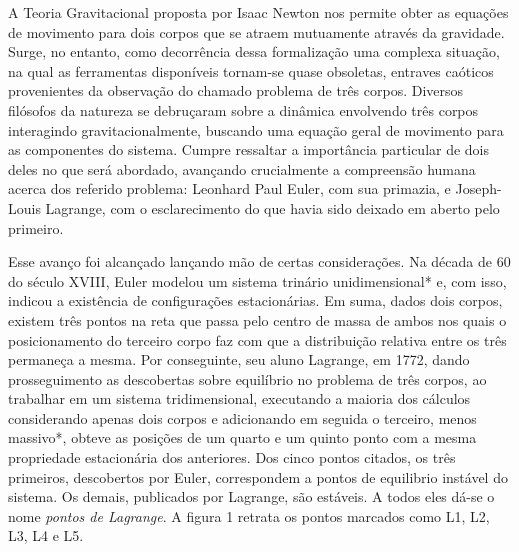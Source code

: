 A Teoria Gravitacional proposta por Isaac Newton nos permite obter as equações de movimento para  dois corpos que se atraem mutuamente através da gravidade. Surge, no entanto, como decorrência dessa formalização uma complexa situação, na qual as ferramentas disponíveis tornam-se quase obsoletas, entraves caóticos provenientes da observação do chamado problema de três corpos. Diversos filósofos da natureza se debruçaram sobre a dinâmica envolvendo três corpos interagindo gravitacionalmente, buscando uma equação geral de movimento para as componentes do sistema. Cumpre ressaltar a importância particular de dois deles no que será abordado, avançando crucialmente a compreensão humana acerca dos referido problema: Leonhard Paul Euler, com sua primazia, e Joseph-Louis Lagrange, com o esclarecimento do que havia sido deixado em aberto pelo primeiro.
   
Esse avanço foi alcançado lançando mão de certas considerações. Na década de 60 do século XVIII, Euler modelou um sistema trinário unidimensional* e, com isso, indicou a existência de configurações estacionárias. Em suma, dados dois corpos, existem três pontos na reta que passa pelo centro de massa de ambos nos quais o posicionamento do terceiro corpo faz com que a distribuição relativa entre os três permaneça a mesma. Por conseguinte, seu aluno Lagrange, em 1772, dando prosseguimento as descobertas sobre equilíbrio no problema de três corpos, ao trabalhar em um sistema tridimensional, executando a maioria dos cálculos considerando apenas dois corpos e adicionando em seguida o terceiro, menos massivo*, obteve as posições de um quarto e um quinto ponto com a mesma propriedade estacionária dos anteriores. Dos cinco pontos citados, os três primeiros, descobertos por Euler, correspondem a pontos de equilibrio instável do sistema. Os demais, publicados por Lagrange, são estáveis. A todos eles dá-se o nome \textit{pontos de Lagrange}. A figura 1 retrata os pontos marcados como L1, L2, L3, L4 e L5.

